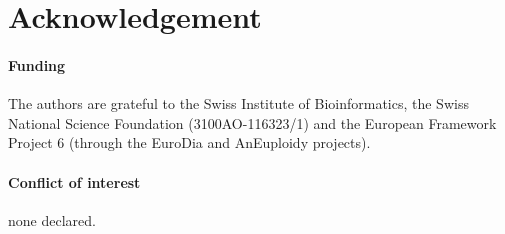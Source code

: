 \documentclass[round]{bioinfo}
\begin{document}
\vspace*{-9pt}
\section*{Acknowledgement}

\paragraph{Funding\textcolon} The authors are grateful to the Swiss
Institute of Bioinformatics, the Swiss National Science Foundation
(3100AO-116323/1) and the European Framework Project 6 (through
the EuroDia and AnEuploidy projects).

\paragraph{Conflict of interest\textcolon} none declared.

\vspace*{-9pt}


\end{document}

